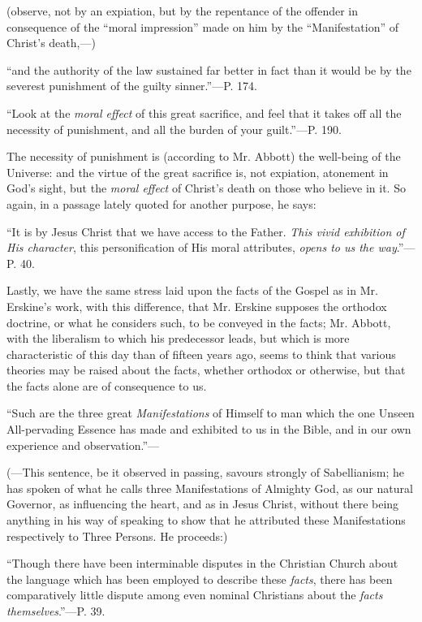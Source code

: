 (observe, not by an expiation, but by the
repentance of the offender in consequence of the ``moral
impression'' made on him by the ``Manifestation'' of Christ's
death,—)

``and the
authority of the law sustained far better in fact than it would be by
the severest punishment of the guilty sinner.''—P. 174.

``Look at the \emph{moral
effect} of this great sacrifice, and feel that it takes off all the
necessity of punishment, and all the burden of your guilt.''—P.
190.

The necessity of punishment is (according to Mr.
Abbott) the well-being of the Universe: and the virtue of the great
sacrifice is, not expiation, atonement in God's sight, but the \emph{moral
effect} of Christ's death on those who believe in it. So again,
in a passage lately quoted for another purpose, he says:

``It is by Jesus
Christ that we have access to the Father. \emph{This vivid exhibition of
His character}, this personification of His moral attributes, \emph{opens
to us the way}.''—P. 40.

Lastly, we have the same stress laid upon the
facts of the Gospel as in Mr. Erskine's work, with this difference,
that Mr. Erskine supposes the orthodox doctrine, or what he considers
such, to be conveyed in the facts; Mr. Abbott, with the liberalism to
which his predecessor leads, but which is more characteristic of this
day than of fifteen years ago, seems to think that various theories
may be raised about the facts, whether orthodox or otherwise, but that
the facts alone are of consequence to us.

``Such are the
three great \emph{Manifestations} of Himself to man which the one
Unseen All-pervading Essence has made and exhibited to us in the
Bible, and in our own experience and observation.''—

(—This sentence, be it observed in passing,
savours strongly of Sabellianism; he has spoken of what he calls three
Manifestations of Almighty God, as our natural Governor, as
influencing the heart, and as in Jesus Christ, without there being
anything in his way of speaking to show that he attributed these
Manifestations respectively to Three Persons. He proceeds:)

``Though there
have been interminable disputes in the Christian Church
about the language which has been employed to describe these \emph{facts},
there has been comparatively little dispute among even nominal
Christians about the \emph{facts themselves}.''—P. 39.

